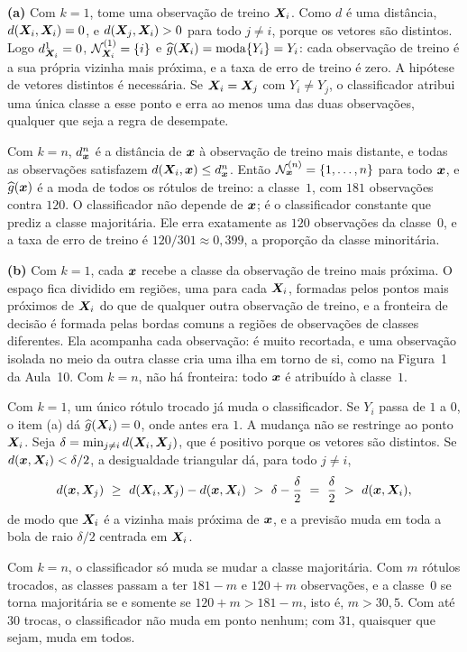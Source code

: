 \documentclass[11pt,a4paper]{article}
\begin{document}
\begin{solucao}
\textbf{(a)} Com $k=1$, tome uma observação de treino $\bm{X}_i$. Como $d$ é uma distância,
$d(\bm{X}_i,\bm{X}_i)=0$, e $d(\bm{X}_j,\bm{X}_i)>0$ para todo $j\ne i$, porque os vetores são
distintos. Logo $d^1_{\bm{X}_i}=0$, $\mathcal{N}^{(1)}_{\bm{X}_i}=\{i\}$ e
$\widehat{g}(\bm{X}_i)=\operatorname{moda}\{Y_i\}=Y_i$: cada observação de treino é a sua própria
vizinha mais próxima, e a taxa de erro de treino é zero. A hipótese de vetores distintos
é necessária. Se $\bm{X}_i=\bm{X}_j$ com $Y_i\ne Y_j$, o classificador atribui uma única classe a
esse ponto e erra ao menos uma das duas observações, qualquer que seja a regra de
desempate.

Com $k=n$, $d^n_{\bm{x}}$ é a distância de $\bm{x}$ à observação de treino mais distante, e
todas as observações satisfazem $d(\bm{X}_i,\bm{x})\le d^n_{\bm{x}}$. Então
$\mathcal{N}^{(n)}_{\bm{x}}=\{1,\dots,n\}$ para todo $\bm{x}$, e $\widehat{g}(\bm{x})$ é a moda de todos
os rótulos de treino: a classe~$1$, com $181$ observações contra $120$. O classificador
não depende de $\bm{x}$; é o classificador constante que prediz a classe majoritária. Ele
erra exatamente as $120$ observações da classe~$0$, e a taxa de erro de treino é
$120/301\approx0{,}399$, a proporção da classe minoritária.

\smallskip
\textbf{(b)} Com $k=1$, cada $\bm{x}$ recebe a classe da observação de treino mais próxima.
O espaço fica dividido em regiões, uma para cada $\bm{X}_i$, formadas pelos pontos mais
próximos de $\bm{X}_i$ do que de qualquer outra observação de treino, e a fronteira de
decisão é formada pelas bordas comuns a regiões de observações de classes diferentes.
Ela acompanha cada observação: é muito recortada, e uma observação isolada no meio da
outra classe cria uma ilha em torno de si, como na Figura~1 da Aula~10. Com $k=n$, não
há fronteira: todo $\bm{x}$ é atribuído à classe~$1$.

Com $k=1$, um único rótulo trocado já muda o classificador. Se $Y_i$ passa de $1$ a $0$,
o item (a) dá $\widehat{g}(\bm{X}_i)=0$, onde antes era $1$. A mudança não se restringe ao ponto
$\bm{X}_i$. Seja $\delta=\min_{j\ne i}d(\bm{X}_i,\bm{X}_j)$, que é positivo porque os vetores são
distintos. Se $d(\bm{x},\bm{X}_i)<\delta/2$, a desigualdade triangular dá, para todo $j\ne i$,
\[
  d(\x,\X_j)\ \ge\ d(\X_i,\X_j)-d(\x,\X_i)\ >\ \delta-\frac{\delta}{2}
  \ =\ \frac{\delta}{2}\ >\ d(\x,\X_i),
\]
de modo que $\bm{X}_i$ é a vizinha mais próxima de $\bm{x}$, e a previsão muda em toda a bola de
raio $\delta/2$ centrada em $\bm{X}_i$.

Com $k=n$, o classificador só muda se mudar a classe majoritária. Com $m$ rótulos
trocados, as classes passam a ter $181-m$ e $120+m$ observações, e a classe~$0$ se torna
majoritária se e somente se $120+m>181-m$, isto é, $m>30{,}5$. Com até $30$ trocas, o
classificador não muda em ponto nenhum; com $31$, quaisquer que sejam, muda em todos.


\end{solucao}
\end{document}
